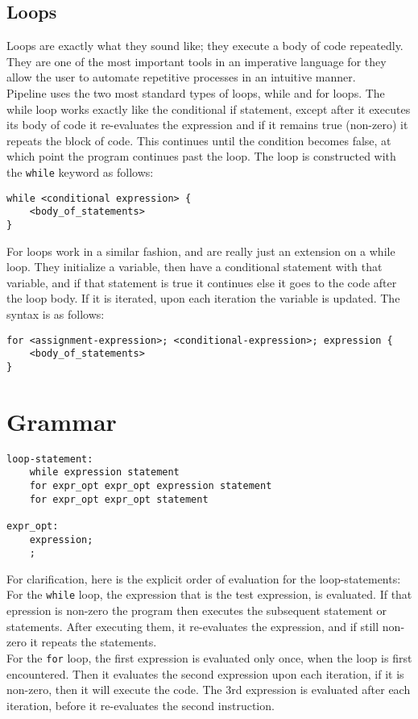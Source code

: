 \documentclass[./LRM_main.tex]{subfiles}
\begin{document}
\subsection{Loops}
Loops are exactly what they sound like; they execute a body of code repeatedly. They are one of the most important tools in an imperative language for they allow the user to automate repetitive processes in an intuitive manner.\\
Pipeline uses the two most standard types of loops, while and for loops. The while loop works exactly like the conditional if statement, except after it executes its body of code it re-evaluates the expression and if it remains true (non-zero) it repeats the block of code. This continues until the condition becomes false, at which point the program continues past the loop. The loop is constructed with the \texttt{while} keyword as follows:
\begin{lstlisting}
while <conditional expression> {
	<body_of_statements>
}
\end{lstlisting}
For loops work in a similar fashion, and are really just an extension on a while loop. They initialize a variable, then have a conditional statement with that variable, and if that statement is true it continues else it goes to the code after the loop body. If it is iterated, upon each iteration the variable is updated. The syntax is as follows:
\begin{lstlisting}
for <assignment-expression>; <conditional-expression>; expression {
	<body_of_statements>
}
\end{lstlisting}
\section{Grammar}
\begin{lstlisting}
loop-statement:
	while expression statement
	for expr_opt expr_opt expression statement
	for expr_opt expr_opt statement

expr_opt:
	expression;
	;	
\end{lstlisting}
For clarification, here is the explicit order of evaluation for the loop-statements:\\
For the \texttt{while} loop, the expression that is the test expression, is evaluated. If that epression is non-zero the program then executes the subsequent statement or statements. After executing them, it re-evaluates the expression, and if still non-zero it repeats the statements.\\
For the \texttt{for} loop, the first expression is evaluated only once, when the loop is first encountered. Then it evaluates the second expression upon each iteration, if it is non-zero, then it will execute the code. The 3rd expression is evaluated after each iteration, before it re-evaluates the second instruction.
\end{document}
